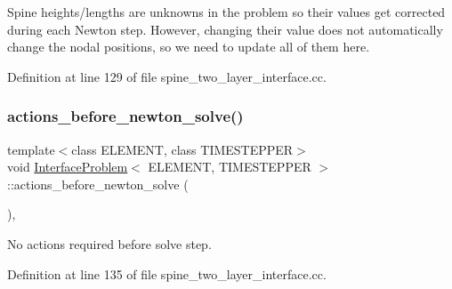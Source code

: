 Spine heights/lengths are unknowns in the problem so their values get corrected during each Newton step. However, changing their value does not automatically change the nodal positions, so we need to update all of them here. 



Definition at line 129 of file spine\+\_\+two\+\_\+layer\+\_\+interface.\+cc.

\mbox{\label{classInterfaceProblem_ade63c8a74f666edf530460b989968b4f}} 
\subsubsection{\texorpdfstring{actions\+\_\+before\+\_\+newton\+\_\+solve()}{actions\_before\_newton\_solve()}\hspace{0.1cm}{\footnotesize\ttfamily [1/2]}}
{\footnotesize\ttfamily template$<$class E\+L\+E\+M\+E\+NT, class T\+I\+M\+E\+S\+T\+E\+P\+P\+ER$>$ \\
void \hyperlink{classInterfaceProblem}{Interface\+Problem}$<$ E\+L\+E\+M\+E\+NT, T\+I\+M\+E\+S\+T\+E\+P\+P\+ER $>$\+::actions\+\_\+before\+\_\+newton\+\_\+solve (\begin{DoxyParamCaption}{ }\end{DoxyParamCaption})\hspace{0.3cm}{\ttfamily [inline]}, {\ttfamily [private]}}



No actions required before solve step. 



Definition at line 135 of file spine\+\_\+two\+\_\+layer\+\_\+interface.\+cc.

\mbox{\label{classInterfaceProblem_ade63c8a74f666edf530460b989968b4f}} 
